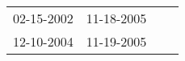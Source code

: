\begin{supertabular}{llll}
 02-15-2002 &  11-18-2005 \\
 12-10-2004 &  11-19-2005 \\
\end{supertabular}
